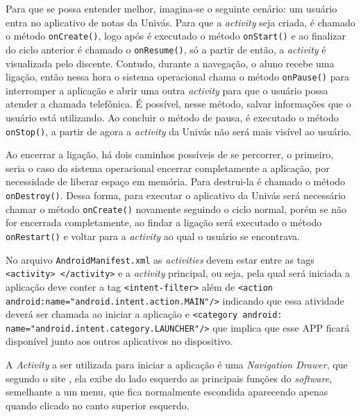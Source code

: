 	\par Para que se possa entender melhor, imagina-se o seguinte cenário: um
usuário entra no aplicativo de notas da Univás. Para que a \textit{activity}
seja criada, é chamado o método \texttt{onCreate()}, logo após é executado o
método \texttt{onStart()} e ao finalizar do ciclo anterior é chamado o
\texttt{onResume()}, só a partir de então, a \textit{activity} é visualizada
pelo discente. Contudo, durante a navegação, o aluno recebe uma ligação, então nessa
hora o sistema operacional chama o método \texttt{onPause()} para interromper a
aplicação e abrir uma outra \textit{activity} para que o usuário possa atender
a chamada telefônica. É possível, nesse método, salvar informações que o
usuário está utilizando. Ao concluir o método de pausa, é executado o método
\texttt{onStop()}, a partir de agora a \textit{activity} da Univás não será
mais visível ao usuário.

 	\par Ao encerrar a ligação, há dois caminhos possíveis de
se percorrer, o primeiro, seria o caso do sistema operacional encerrar
completamente a aplicação, por necessidade de liberar espaço em memória. Para destrui-la 
é chamado o método \texttt{onDestroy()}. Dessa forma, para executar o aplicativo
da Univás será necessário chamar o método \texttt{onCreate()} novamente
seguindo o ciclo normal, porém se não for encerrada completamente, ao findar a
ligação será executado o método \texttt{onRestart()} e voltar para a
\textit{activity} ao qual o usuário se encontrava.

	\par No arquivo \texttt{AndroidManifest.xml} as \textit{activities} devem estar
entre as tags \texttt{<activity> </activity>} e a \textit{activity} principal,
ou seja, pela qual será iniciada a aplicação deve conter a tag
\texttt{<intent-filter>} além de \texttt{<action
android:name="android.intent.action.MAIN"/>} indicando que essa atividade
deverá ser chamada ao iniciar a aplicação e \texttt{<category
android:\\name="android.intent.category.LAUNCHER"/>} que implica que esse
APP ficará disponível junto
aos outros aplicativos no dispositivo.

	\par A \textit{Activity} a ser utilizada para iniciar a aplicação é uma
\textit{Navigation Drawer}, que segundo o site , ela exibe
do lado esquerdo as principais funções do \textit{software}, semelhante a um
menu, que fica normalmente escondida aparecendo apenas quando clicado no canto
superior esquerdo.

